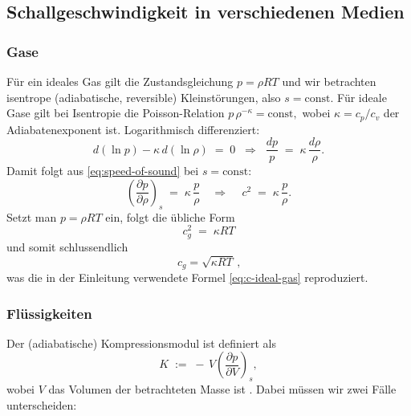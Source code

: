 \subsection{Schallgeschwindigkeit in verschiedenen Medien}

\subsubsection*{Gase}
Für ein ideales Gas gilt die Zustandsgleichung
\(
    p=\rho R T
\)
und wir betrachten isentrope (adiabatische, reversible) Kleinstörungen,
also \(s=\mathrm{const}\).
Für ideale Gase gilt bei Isentropie die Poisson-Relation
\(
    p\,\rho^{-\kappa}=\mathrm{const},
\)
wobei \(\kappa=c_p/c_v\) der Adiabatenexponent ist.
Logarithmisch differenziert:
\[
    d(\ln p) - \kappa\, d(\ln \rho) \;=\; 0
    \;\;\Longrightarrow\;\;
    \frac{dp}{p} \;=\; \kappa\,\frac{d\rho}{\rho}.
\]
Damit folgt aus \eqref{eq:speed-of-sound} bei \(s=\mathrm{const}\):
\[
    \left(\frac{\partial p}{\partial \rho}\right)_{s}
    \;=\; \kappa\,\frac{p}{\rho}
\quad\Longrightarrow\quad
    \,c^2 \;=\; \kappa\,\frac{p}{\rho}.
\]
Setzt man \(p=\rho R T\) ein, folgt die übliche Form
\[
    c_g^2 \;=\; \kappa R T
\]
und somit schlussendlich
\begin{equation}
    \,c_g=\sqrt{\kappa R T}\,,
\end{equation}
was die in der Einleitung verwendete Formel \eqref{eq:c-ideal-gas} reproduziert.

\subsubsection*{Flüssigkeiten}

Der (adiabatische) Kompressionsmodul ist definiert als
\begin{equation}
  K \;:=\; -\,V\left(\frac{\partial p}{\partial V}\right)_{s},
  \label{eq:def-bulk}
\end{equation}
wobei $V$ das Volumen der betrachteten Masse ist \cite{schall:will}.
Dabei müssen wir zwei Fälle unterscheiden:

